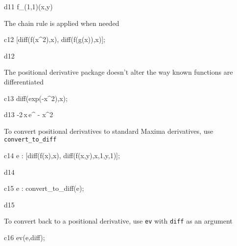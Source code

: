 \documentclass[12pt]{article}
\begin{document}
\begin{mdline}{d11}
   f_{\left(1,1\right)}(x,y)
\end{mdline}


\noindent The chain rule is applied when needed


\begin{mcline}{c12}
     [diff(f(x^2),x), diff(f(g(x)),x)];
\end{mcline}



\begin{mdline}{d12}
\end{mdline}


The positional derivative package doesn't alter the way known functions
are differentiated


\begin{mcline}{c13}
     diff(exp(-x^2),x);
\end{mcline}



\begin{mdline}{d13}
   -2\,x\,e^ {- x^2 }
\end{mdline}


\noindent To convert positional derivatives to standard Maxima derivatives,
use {\tt convert\_to\_diff}


\begin{mcline}{c14}
     e : [diff(f(x),x), diff(f(x,y),x,1,y,1)];
\end{mcline}



\begin{mdline}{d14}
\end{mdline}

\begin{mcline}{c15}
   e : convert_to_diff(e);
\end{mcline}



\begin{mdline}{d15}
\end{mdline}

\noindent To convert back to a positional derivative, use {\tt ev} with {\tt diff} 
as an argument


\begin{mcline}{c16}
     ev(e,diff);
\end{mcline}
\end{document}
